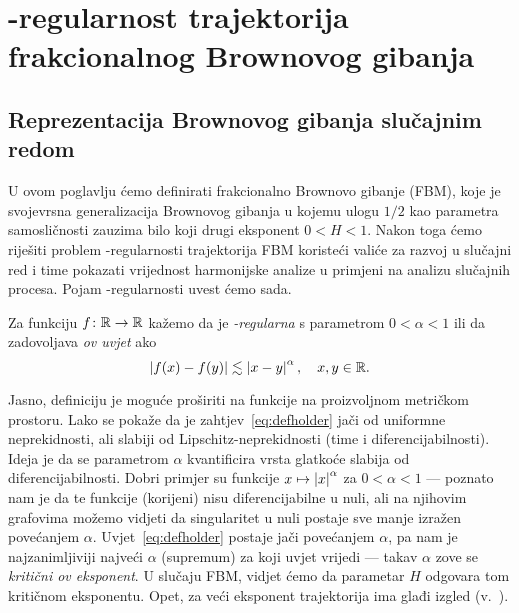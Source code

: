 \documentclass[main.tex]{subfiles}
\begin{document}
\nocite{*}

\chapter[\holder -regularnost trajektorija FBM]{\holder -regularnost trajektorija frakcionalnog Brownovog gibanja}\label{chapter-gl}
\section{Reprezentacija Brownovog gibanja slučajnim redom}\label{sec:gl-brown}
U ovom poglavlju ćemo definirati frakcionalno Brownovo gibanje (FBM), koje je svojevrsna generalizacija
Brownovog gibanja u kojemu ulogu \( 1/2 \) kao parametra samosličnosti zauzima bilo koji drugi
eksponent \( 0 < H < 1 \). Nakon toga ćemo riješiti problem \holder -regularnosti trajektorija FBM
koristeći valiće za razvoj u slučajni red i time pokazati vrijednost harmonijske analize
u primjeni na analizu slučajnih procesa. Pojam \holder -regularnosti uvest ćemo sada.

\begin{definicija}
	Za funkciju \( f \colon \mathbb{R} \to \mathbb{R} \) kažemo da je \emph{\holder -regularna} s parametrom
	\( 0 < \alpha < 1 \) ili da zadovoljava \emph{\holder ov uvjet} ako
	\begin{equation} \label{eq:defholder}
		\left| {f(x)-f(y)} \right| \lesssim \left| {x-y} \right|^\alpha, \quad x,y \in \mathbb{R}.
	\end{equation}
\end{definicija}

Jasno, definiciju je moguće proširiti na funkcije na proizvoljnom metričkom prostoru.
Lako se pokaže da je zahtjev~\eqref{eq:defholder} jači od uniformne neprekidnosti,
ali slabiji od Lipschitz-neprekidnosti (time i diferencijabilnosti). Ideja je da se parametrom
\( \alpha \) kvantificira vrsta glatkoće slabija od diferencijabilnosti. Dobri primjer su funkcije
\( x \mapsto \left| {x} \right| ^\alpha \) za \( 0 < \alpha < 1 \) --- poznato nam je da te funkcije (korijeni)
nisu diferencijabilne u nuli, ali na njihovim grafovima možemo vidjeti da singularitet u nuli
postaje sve manje izražen povećanjem \( \alpha \). Uvjet~\eqref{eq:defholder} postaje
jači povećanjem \( \alpha \), pa nam je najzanimljiviji najveći \( \alpha \) (supremum) za koji uvjet vrijedi --- takav
\( \alpha \) zove se \emph{kritični \holder ov eksponent}. U slučaju
FBM, vidjet ćemo da parametar \( H \) odgovara tom kritičnom eksponentu. Opet,
za veći eksponent trajektorija ima glađi izgled (v.~\cite[str.~6]{se}).
\end{document}
